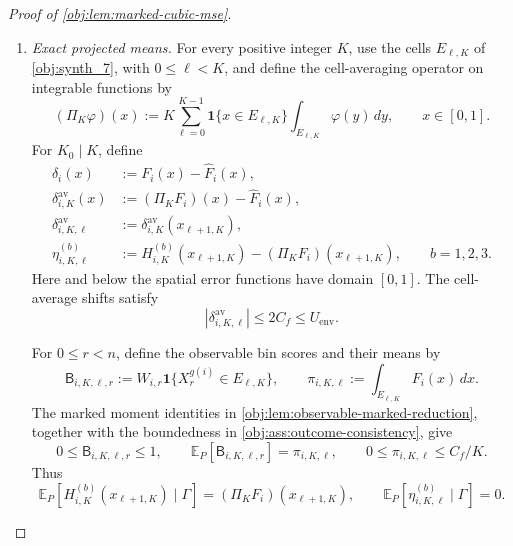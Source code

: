 \documentclass[11pt]{article}
\begin{document}
\begin{proof}[Proof of \cref{obj:lem:marked-cubic-mse}]
\begin{enumerate}
The exact block sizes and the dyadic rules of
\cref{obj:synth_3,obj:synth_4,obj:synth_5,obj:synth_6}
give
\[
m_b\ge\lfloor n/4\rfloor\ge n/4-1\ge n/5>0
\quad(b=0,1,2,3),
\]
and
\[
\frac12m_0^{4/5}\le K_0\le m_0^{4/5},\qquad
\frac12m_0^{4/3}\le K_2\le m_0^{4/3},\qquad
\frac12m_0\le K_3\le m_0.
\]
Indeed, rounding a nonnegative logarithmic exponent down changes its power of two by a factor between \(1/2\) and \(1\). In particular,
\[
K_2\le n^{4/3},\qquad K_3\le n.
\]
The nesting property in \cref{obj:def:cubic-estimator} ensures that the pilot is constant on every correction cell, including its assigned endpoints.

\item \textit{Exact projected means.}
For every positive integer \(K\), use the cells \(E_{\ell,K}\) of \cref{obj:synth_7}, with \(0\le\ell<K\), and define the cell-averaging operator on integrable functions by
\[
(\Pi_K\varphi)(x)
:=
K\sum_{\ell=0}^{K-1}\mathbf1\{x\in E_{\ell,K}\}
\int_{E_{\ell,K}}\varphi(y)\,dy,
\qquad x\in[0,1].
\]
For \(K_0\mid K\), define
\[
\begin{aligned}
\delta_i(x)&:=F_i(x)-\widehat F_i(x),\\
\delta^{\mathrm{av}}_{i,K}(x)
&:=(\Pi_KF_i)(x)-\widehat F_i(x),\\
\delta^{\mathrm{av}}_{i,K,\ell}
&:=\delta^{\mathrm{av}}_{i,K}(x_{\ell+1,K}),\\
\eta^{(b)}_{i,K,\ell}
&:=H_{i,K}^{(b)}(x_{\ell+1,K})
-(\Pi_KF_i)(x_{\ell+1,K}),
\qquad b=1,2,3.
\end{aligned}
\]
Here and below the spatial error functions have domain \([0,1]\). The cell-average shifts satisfy
\[
|\delta^{\mathrm{av}}_{i,K,\ell}|
\le2C_f\le U_{\mathrm{env}}.
\]

For \(0\le r<n\), define the observable bin scores and their means by
\[
\mathsf B_{i,K,\ell,r}
:=
W_{i,r}\mathbf1\{X_r^{g(i)}\in E_{\ell,K}\},
\qquad
\pi_{i,K,\ell}:=\int_{E_{\ell,K}}F_i(x)\,dx.
\]
The marked moment identities in \cref{obj:lem:observable-marked-reduction}, together with the boundedness in \cref{obj:ass:outcome-consistency}, give
\[
0\le\mathsf B_{i,K,\ell,r}\le1,\qquad
\mathbb E_P[\mathsf B_{i,K,\ell,r}]=\pi_{i,K,\ell},
\qquad
0\le\pi_{i,K,\ell}\le C_f/K.
\]
Thus
\[
\mathbb E_P[H_{i,K}^{(b)}(x_{\ell+1,K})\mid\Gamma]
=(\Pi_KF_i)(x_{\ell+1,K}),
\qquad
\mathbb E_P[\eta^{(b)}_{i,K,\ell}\mid\Gamma]=0.
\]


\end{enumerate}
\end{proof}
\end{document}
